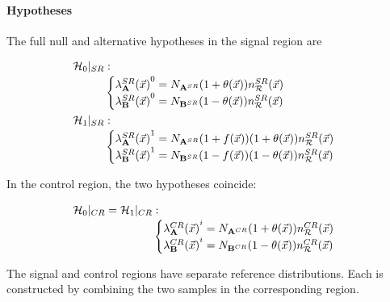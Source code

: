 \documentclass[paper/ddppaper2.tex]{subfiles}
\begin{document}
\paragraph{Hypotheses}

The full null and alternative hypotheses in the signal region are

\begin{wideequations}
\begin{equation}
\label{eq:sr_hypothesis_statement}
\begin{aligned}
    \nullhypothesis |_{SR} &:\\[-0.5ex]
    &\begin{cases}
        {\srdist{\dataset{A}}^0} = N_\srdataset{A} (1 + {\nparam(\anyevent)}) \srrefdist \\
        {\srdist{\dataset{B}}^0} = N_\srdataset{B} (1 - {\nparam(\anyevent)}) \srrefdist
    \end{cases} \\
    \hypothesis{1} |_{SR} &:\\[-0.5ex]
    &\begin{cases}
        {\srdist{\dataset{A}}^1} = N_\srdataset{A} (1 + f(\anyevent)) (1 + {\nparam(\anyevent)}) \srrefdist \\
        {\srdist{\dataset{B}}^1} = N_\srdataset{B} (1 - f(\anyevent)) (1 - {\nparam(\anyevent)}) \srrefdist
    \end{cases}
\end{aligned}
\end{equation}

In the control region, the two hypotheses coincide:

\begin{equation}
\label{eq:cr_hypothesis_statement}
\begin{aligned}
    \nullhypothesis |_{CR} = \hypothesis{1} |_{CR} &:\\[-0.5ex]
    &\begin{cases}
        \crdist{\dataset{A}}^i = N_\crdataset{A} (1 + {\nparam(\anyevent)}) \crrefdist \\
        \crdist{\dataset{B}}^i = N_\crdataset{B} (1 - {\nparam(\anyevent)}) \crrefdist
    \end{cases}
\end{aligned}
\end{equation}
\end{wideequations}

The signal and control regions have separate reference distributions. Each is constructed by combining the two samples in the corresponding region.
\end{document}
